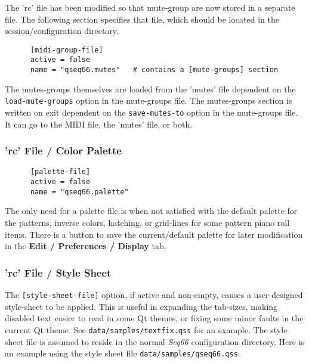    The 'rc' file has been modified so that mute-group are now stored in a
   separate file.  The following section specifies that file, which should be
   located in the session/configuration directory.

   \begin{verbatim}
      [midi-group-file]
      active = false
      name = "qseq66.mutes"   # contains a [mute-groups] section
   \end{verbatim}

   The mutes-groups themselves are loaded from the 'mutes' file dependent on
   the \texttt{load-mute-groups} option in the mute-groups file.
   The mutes-groups section is written on exit dependent on the
   \texttt{save-mutes-to} option in the mute-groups file.
   It can go to the MIDI file, the 'mutes' file, or both.

\subsubsection{'rc' File / Color Palette}
\label{subsubsec:configuration_rc_color_palette}

   \begin{verbatim}
      [palette-file]
      active = false
      name = "qseq66.palette"
   \end{verbatim}

   The only need for a palette file is when not satisfied with the
   default palette for the patterns, inverse colors, hatching,
   or grid-lines for some pattern piano roll items.
   There is a button to save the current/default
   palette for later modification in the \textbf{Edit / Preferences / Display}
   tab.

\subsubsection{'rc' File / Style Sheet}
\label{subsubsec:configuration_rc_style_sheet}

   The \texttt{[style-sheet-file]} option, if active and non-empty,
   causes a user-designed style-sheet to be applied.
   This is useful in expanding the tab-sizes,
   making disabled text easier to read in some Qt themes, or
   fixing some minor faults in the current Qt theme.
   See \texttt{data/samples/textfix.qss} for an example.
   The style sheet file is assumed to reside in the normal \textsl{Seq66}
   configuration directory.
   Here is an example using the style sheet file
   \texttt{data/samples/qseq66.qss}:

